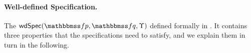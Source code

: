 
\paragraph{\textbf{Well-defined Specification.}}
The $\wdSpec{\relspecpre}{\relspecpost}{\hprim}$ 
defined  formally in 
\Def{\ref{def:well-defined specification}}.  
It contains three properties that 
the specifications need to satisfy, 
and we explain them in turn in the following. 

